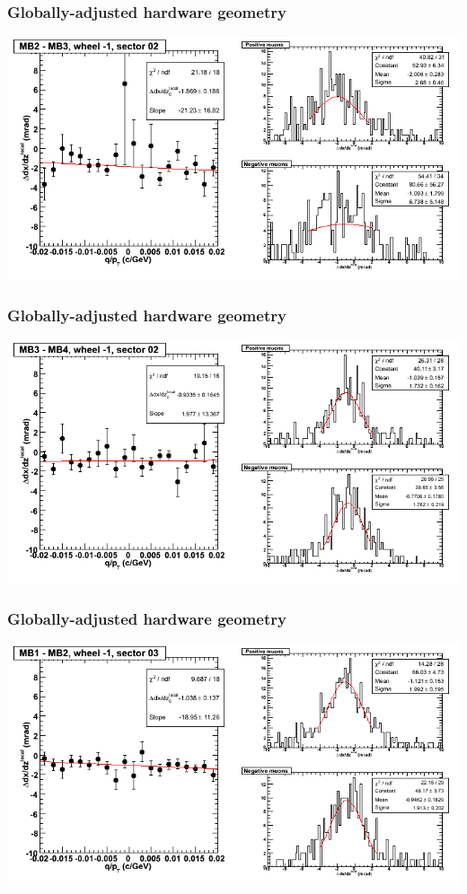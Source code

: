 \documentclass[compress]{beamer}
\begin{document}
\begin{frame}
\frametitle{Globally-adjusted hardware geometry}
\includegraphics[width=\linewidth]{NOV4_segdiffs_HW/dt13_slope_B_02_23.png}
\end{frame}

\begin{frame}
\frametitle{Globally-adjusted hardware geometry}
\includegraphics[width=\linewidth]{NOV4_segdiffs_HW/dt13_slope_B_02_34.png}
\end{frame}

\begin{frame}
\frametitle{Globally-adjusted hardware geometry}
\includegraphics[width=\linewidth]{NOV4_segdiffs_HW/dt13_slope_B_03_12.png}
\end{frame}
\end{document}
